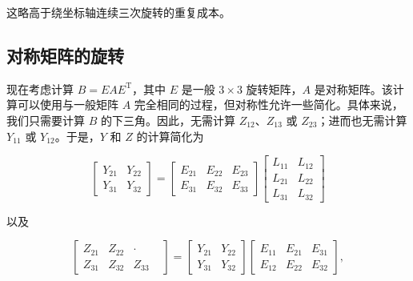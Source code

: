 \documentclass[10pt,a4paper]{book}
\theoremstyle{thmstyle} %
\theoremstyle{defstyle} %
\theoremstyle{prostyle} %
\begin{document}
这略高于绕坐标轴连续三次旋转的重复成本。



\subsection{对称矩阵的旋转}





现在考虑计算 $B = EAE^{\mathrm{T}}$，其中 $E$ 是一般 $3 \times 3$ 旋转矩阵，$A$ 是对称矩阵。该计算可以使用与一般矩阵 $A$ 完全相同的过程，但对称性允许一些简化。具体来说，我们只需要计算 $B$ 的下三角。因此，无需计算 $Z_{12}$、$Z_{13}$ 或 $Z_{23}$；进而也无需计算 $Y_{11}$ 或 $Y_{12}$。于是，$Y$ 和 $Z$ 的计算简化为



$$
\left[ \begin{array}{ll} { Y _ { 21 } } & { Y _ { 22 } } \\{ Y _ { 31 } } & { Y _ { 32 } } \end{array} \right] = \left[ \begin{array}{lll} { E _ { 21 } } & { E _ { 22 } } & { E _ { 23 } } \\{ E _ { 31 } } & { E _ { 32 } } & { E _ { 33 } } \end{array} \right] \left[ \begin{array}{ll} { L _ { 11 } } & { L _ { 12 } } \\{ L _ { 21 } } & { L _ { 22 } } \\{ L _ { 31 } } & { L _ { 32 } } \end{array} \right]
$$



以及



$$
\left[ \begin{array}{llll} { Z _ { 21 } } & { Z _ { 22 } } & { \cdot } & { } \\{ Z _ { 31 } } & { Z _ { 32 } } & { Z _ { 33 } } \end{array} \right] = \left[ \begin{array}{llll} { Y _ { 21 } } & { Y _ { 22 } } \\{ Y _ { 31 } } & { Y _ { 32 } } \end{array} \right] \left[ \begin{array}{llll} { E _ { 11 } } & { E _ { 21 } } & { E _ { 31 } } \\{ E _ { 12 } } & { E _ { 22 } } & { E _ { 32 } } \end{array} \right] ,
$$
\end{document}
